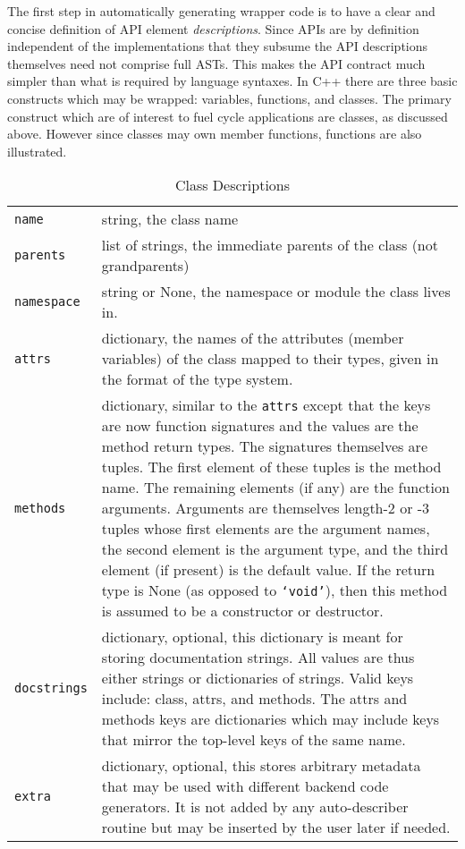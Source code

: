 \documentclass{ansconfpaper}
\newcommand{\vin}[1]{\texttt{{#1}}}
\begin{document}
The first step in automatically generating wrapper code is to have a clear and 
concise definition of API element \emph{descriptions}.  Since APIs are by definition 
independent of the implementations that they subsume the API descriptions themselves
need not comprise full ASTs.  This makes the API contract much simpler than what
is required by language syntaxes.  In C++ there are three
basic constructs which may be wrapped: variables, functions, and classes.  
The primary construct which are of interest to fuel cycle applications are classes, 
as discussed above.  However since classes may own member functions, functions are
also illustrated.

\begin{table*}[htbp]
\begin{center}
\caption{Class Descriptions}
\label{classdesc}
\begin{tabular}{|lp{0.8\hsize}|}
\hline
\vin{name} & string, the class name \\
\vin{parents} & list of strings, the immediate parents of the class (not grandparents) \\
\vin{namespace} & string or None, the namespace or module the class lives in. \\
\vin{attrs} & dictionary, the names of the attributes (member variables) of the
    class mapped to their types, given in the format of the type system. \\
\vin{methods} & dictionary, similar to the \vin{attrs} except that the keys are now
    function signatures and the values are the method return types.  The signatures
    themselves are tuples. The first element of these tuples is the method name.
    The remaining elements (if any) are the function arguments.  Arguments are 
    themselves length-2 or -3 tuples whose first elements are the argument names, 
    the second element is the argument type, and the third element (if present) is
    the default value.  If the return type is None (as opposed to \vin{`void'}), then 
    this method is assumed to be a constructor or destructor. \\
\vin{docstrings} & dictionary, optional, this dictionary is meant for storing 
    documentation strings.  All values are thus either strings or dictionaries of 
    strings.   Valid keys include: class, attrs, and methods.  The attrs and methods
    keys are dictionaries which may include keys that mirror the top-level keys of
    the same name. \\
\vin{extra} & dictionary, optional, this stores arbitrary metadata that may be used 
    with different backend code generators. It is not added by any auto-describer
    routine but may be inserted by the user later if needed.\\
\hline
\end{tabular}
\end{center}
\end{table*}
\end{document}
